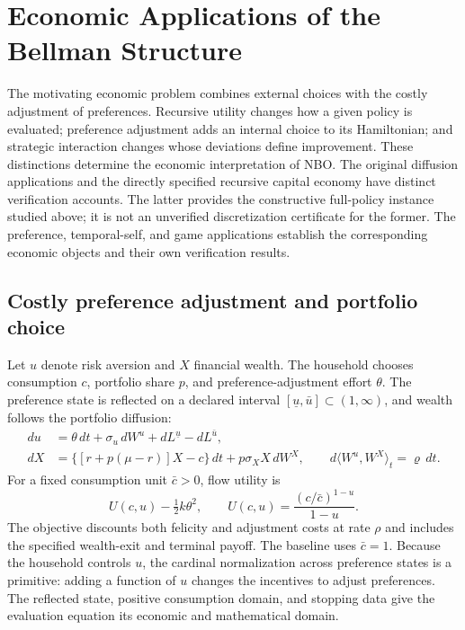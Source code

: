 \section{Economic Applications of the Bellman Structure}\label{sec:economic-scope}
The motivating economic problem combines external choices with the costly adjustment of preferences. Recursive utility changes how a given policy is evaluated; preference adjustment adds an internal choice to its Hamiltonian; and strategic interaction changes whose deviations define improvement. These distinctions determine the economic interpretation of NBO. The original diffusion applications and the directly specified recursive capital economy have distinct verification accounts. The latter provides the constructive full-policy instance studied above; it is not an unverified discretization certificate for the former. The preference, temporal-self, and game applications establish the corresponding economic objects and their own verification results.

\subsection{Costly preference adjustment and portfolio choice}
Let $u$ denote risk aversion and $X$ financial wealth. The household chooses consumption $c$, portfolio share $p$, and preference-adjustment effort $\theta$. The preference state is reflected on a declared interval $[\underline u,\bar u]\subset(1,\infty)$, and wealth follows the portfolio diffusion:
\begin{align}
 du&=\theta\,dt+\sigma_u\,dW^u+dL^{\underline u}-dL^{\bar u},\nonumber\\
 dX&=\{[r+p(\mu-r)]X-c\}\,dt+p\sigma_X X\,dW^X,
 \qquad d\langle W^u,W^X\rangle_t=\varrho\,dt.\label{eq:scope-preferences}
\end{align}
For a fixed consumption unit $\bar c>0$, flow utility is
\[
 U(c,u)-\tfrac12k\theta^2,
 \qquad U(c,u)=\frac{(c/\bar c)^{1-u}}{1-u}.
\]
The objective discounts both felicity and adjustment costs at rate $\rho$ and includes the specified wealth-exit and terminal payoff. The baseline uses $\bar c=1$. Because the household controls $u$, the cardinal normalization across preference states is a primitive: adding a function of $u$ changes the incentives to adjust preferences. The reflected state, positive consumption domain, and stopping data give the evaluation equation its economic and mathematical domain.

